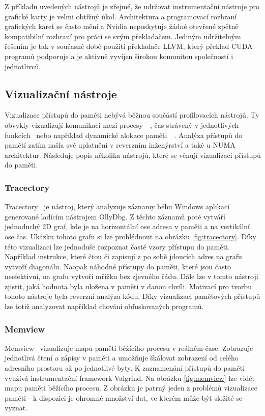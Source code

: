 Z příkladu uvedených nástrojů je zřejmé, že udržovat instrumentační nástroje pro grafické karty je velmi obtížný úkol. Architektura a programovací rozhraní grafických karet se často mění a Nvidia neposkytuje žádné otevřené zpětně kompatibilní rozhraní pro práci se svým překladačem. Jediným udržitelným řešením je tak v současné době použití překladače LLVM, který překlad CUDA programů podporuje a je aktivně vyvíjen širokou komunitou společností i jednotlivců.

\subsection{Vizualizační nástroje}
Vizualizace přístupů do paměti nebývá běžnou součástí profilovacích nástrojů. Ty obvykly vizualizují komunikaci mezi procesy~\cite{tau}~\cite{vampir}, čas strávený v jednotlivých funkcích~\cite{flamegraph} nebo například dynamické alokace paměti~\cite{gcspy}~\cite{dynmem-visualisation}. Analýza přístupů do pamětí zatím našla své uplatnění v reverzním inženýrství a také u NUMA architektur. Následuje popis několika nástrojů, které se věnují vizualizaci přístupů do paměti.

\subsubsection*{Tracectory}
Tracectory~\cite{tracectory} je nástroj, který analyzuje záznamy běhu Windows aplikací generované ladícím nástrojem OllyDbg. Z těchto záznamů poté vytváří jednoduchý 2D graf, kde je na horizontální ose adresa v paměti a na vertikální ose čas. Ukázku tohoto grafu si lze prohlédnout na obrázku \ref{fig:tracectory}. Díky této vizualizaci lze jednoduše rozpoznat časté vzory přístupu do paměti. Například instrukce, které čtou či zapisují z po sobě jdoucích adres na grafu vytvoří diagonálu. Naopak náhodné přístupy do paměti, které jsou často neefektivní, na grafu vytvoří mřížku bez zjevného řádu. Dále lze v tomto nástroji zjistit, jaká hodnota byla uložena v paměti v danou chvíli. Motivací pro tvorbu tohoto nástroje byla reverzní analýza kódu. Díky vizualizaci paměťových přístupů lze totiž analyzovat například chování obfuskovaných programů.

\subsubsection*{Memview}
Memview~\cite{memview} vizualizuje mapu paměti běžícího procesu v reálném čase. Zobrazuje jednotlivá čtení a zápisy v paměti a umožňuje škálovat zobrazení od celého adresního prostoru až po jednotlivé byty. K zaznamenání přístupů do paměti využívá instrumentační framework Valgrind. Na obrázku \ref{fig:memview} lze vidět mapu paměti běžícího procesu. Z obrázku je patrný jeden z problémů vizualizace paměti - k dispozici je ohromné množství dat, ve kterém může být složité se vyznat.

